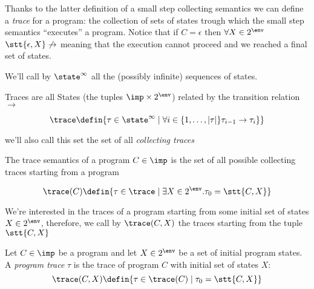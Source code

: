 Thanks to the latter definition of a small step collecting semantics
we can define a \emph{trace} for a program: the collection of sets of
states trough which the small step semantics ``executes'' a
program. Notice that if \(C = \epsilon\) then \(\forall X \in 2^\env\)
\(\stt{ \epsilon , X } \not\to\) meaning that the execution
cannot proceed and we reached a final set of states.

\begin{notation}
  We'll call by \(\state^\infty\) all the (possibly infinite)
  sequences of states.
\end{notation}

\begin{definition}[Trace]
  Traces are all States (the tuples \(\imp \times 2^\env\)) related by
  the transition relation \(\to\)

  \[\trace \defin \{\tau \in \state^\infty \mid \forall i \in \{1, \dots, |\tau|\} \tau_{i-1} \to \tau_i\} \}\]
  
  we'll also call this set the set of all \emph{collecting traces}
\end{definition}

\begin{definition}
  The trace semantics of a program \(C\in\imp\) is the set of all
  possible collecting traces starting from a program
  
  \[\trace(C) \defin \{\tau \in \trace \mid \exists X \in 2^\env . \tau_0 = \stt{ C, X } \}\]

\end{definition}

We're interested in the traces of a program starting from some initial
set of states \(X \in 2^\env\), therefore, we call by \(\trace
(C,X)\) the traces starting from the tuple \(\stt{ C, X
}\)

\begin{definition}
  Let \(C \in \imp\) be a program and let \(X \in 2^\env\) be a set of
  initial program states. A \emph{program trace} \(\tau\) is the trace
  of program \(C\) with initial set of states \(X\): \[\trace (C,X)
  \defin \{\tau \in \trace (C) \mid \tau_0 = \stt{ C, X }\}\]
\end{definition}


